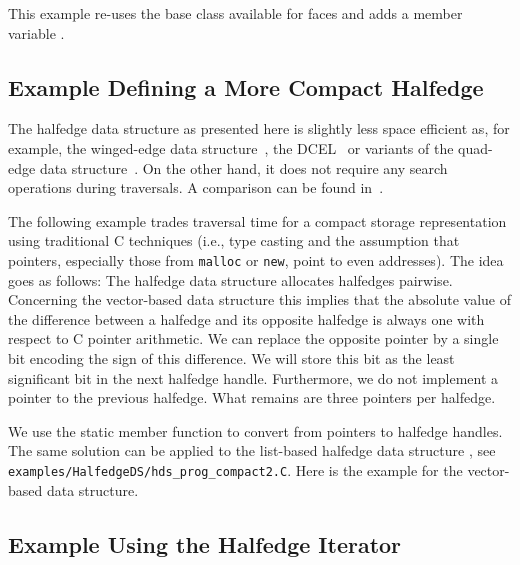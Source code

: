 This example re-uses the base class available for faces and adds a
member variable .


\subsection{Example Defining a More Compact Halfedge}

\begin{ccAdvanced}
  
The halfedge data structure as presented here is slightly less space
efficient as, for example, the winged-edge data
structure~\cite{b-prcv-75}, the DCEL~\cite{mp-fitcp-78} or variants of
the quad-edge data structure~\cite{gs-pmgsc-85}.  On the other hand,
it does not require any search operations during traversals. A
comparison can be found in~\cite{k-ugpdd-99}.

The following example trades traversal time for a compact storage
representation using traditional C techniques (i.e., type casting and
the assumption that pointers, especially those from {\tt malloc} or
{\tt new}, point to even addresses). The idea goes as follows: The
halfedge data structure allocates halfedges pairwise.  Concerning the
vector-based data structure this implies that the absolute value of
the difference between a halfedge and its opposite halfedge is always
one with respect to C pointer arithmetic. We can replace the opposite
pointer by a single bit encoding the sign of this difference.  We will
store this bit as the least significant bit in the next halfedge
handle.  Furthermore, we do not implement a pointer to the previous
halfedge. What remains are three pointers per halfedge. 

We use the static member function  to convert
from pointers to halfedge handles. The same solution can be applied to
the list-based halfedge data structure ,
see \texttt{examples/HalfedgeDS/hds\_prog\_compact2.C}. Here is the
example for the vector-based data structure.


\end{ccAdvanced}

\subsection{Example Using the Halfedge Iterator}

